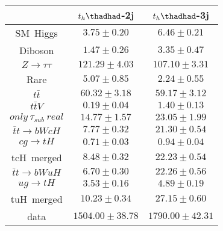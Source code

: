 \centering
\begin{tabular}{ccc} \toprule\toprule
 & $t_{h}\thadhad$-2j & $t_{h}\thadhad$-3j\\ \midrule
\hspace{9mm}SM~Higgs & $3.75\pm0.20$ & $6.46\pm0.21$\\
\hspace{9mm}Diboson & $1.47\pm0.26$ & $3.35\pm0.47$\\
\hspace{9mm}$Z\to\tau\tau$ & $121.29\pm4.03$ & $107.10\pm3.31$\\
\hspace{9mm}Rare & $5.07\pm0.85$ & $2.24\pm0.55$\\
\hspace{9mm}$t\bar{t}$ & $60.32\pm3.18$ & $59.17\pm3.12$\\
\hspace{9mm}$t\bar{t}V$ & $0.19\pm0.04$ & $1.40\pm0.13$\\
\hspace{9mm}$only~\tau_{sub}~real$ & $14.77\pm1.57$ & $23.05\pm1.99$\\\midrule
\hspace{9mm}$\bar{t}t\to bWcH$ & $7.77\pm0.32$ & $21.30\pm0.54$\\
\hspace{9mm}$cg\to tH$ & $0.71\pm0.03$ & $0.94\pm0.04$\\
tcH~merged & $8.48\pm0.32$ & $22.23\pm0.54$\\
\hspace{9mm}$\bar{t}t\to bWuH$ & $6.70\pm0.30$ & $22.26\pm0.56$\\
\hspace{9mm}$ug\to tH$ & $3.53\pm0.16$ & $4.89\pm0.19$\\
tuH~merged & $10.23\pm0.34$ & $27.15\pm0.60$\\\midrule
data & $1504.00\pm38.78$ & $1790.00\pm42.31$\\

\bottomrule\bottomrule
\end{tabular}
